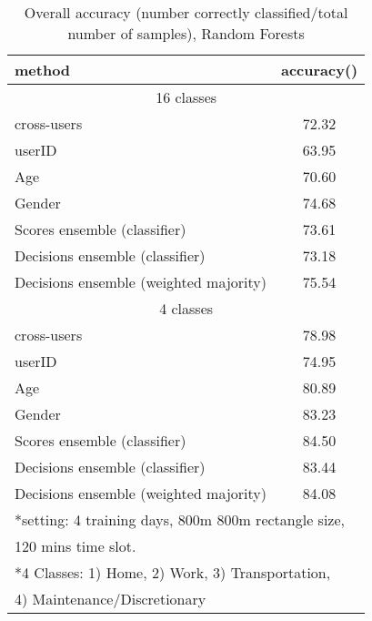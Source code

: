 \documentclass{sig-alternate}
\begin{document}
 \begin{table}[ htb]
 \small
\caption{Overall accuracy (number correctly classified/total number of samples), Random Forests}\label{table:freq_type}
\label{table_result}
\centering
\begin{tabular}{l c   }
\toprule
method  & accuracy()    \\
\hline
 \multicolumn{2}{c}{16 classes }\\
\hline
cross-users 				 	&  72.32 \\
userID			 		 	&  63.95  \\
Age						 	&  70.60 \\
Gender				 	 	&  74.68 \\
Scores ensemble (classifier)		 	&  73.61 \\
Decisions ensemble (classifier)			& 73.18 \\
Decisions ensemble	(weighted majority)   &  75.54 \\
\hline
 \multicolumn{2}{c}{4 classes }\\
\hline
cross-users  					& 78.98\\
userID					        & 74.95\\
Age							& 80.89\\
Gender						& 83.23\\
Scores ensemble (classifier)		& 84.50\\
Decisions ensemble (classifier)		& 83.44\\
Decisions ensemble (weighted majority)         & 84.08\\
\hline
 \bottomrule
 \multicolumn{2}{l}{*setting: 4 training days, 800m  800m rectangle size,  }\\
  \multicolumn{2}{l}{120 mins time slot.  }\\
  \multicolumn{2}{l}{*4 Classes: 1) \textsf{Home}, 2) \textsf{Work}, 3) \textsf{Transportation},  }\\
  \multicolumn{2}{l}{ 4) \textsf{Maintenance/Discretionary}}\\
\end{tabular}\label{table:fusionlevel16and4}
\end{table}
\end{document}
